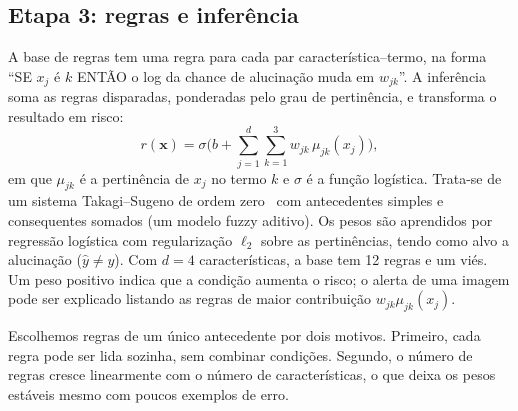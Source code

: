 \documentclass[conference,a4paper]{IEEEtran}
\begin{document}
\subsection{Etapa 3: regras e inferência}
A base de regras tem uma regra para cada par característica--termo, na forma ``SE $x_j$ é $k$ ENTÃO o log da chance de alucinação muda em
$w_{jk}$''. A inferência soma as regras disparadas, ponderadas pelo grau de pertinência, e transforma o resultado em risco:
\begin{equation}
  r(\mathbf{x}) = \sigma\Big(b + \sum_{j=1}^{d}\sum_{k=1}^{3} w_{jk}\,\mu_{jk}(x_j)\Big),
  \label{eq:aditivo}
\end{equation}
em que $\mu_{jk}$ é a pertinência de $x_j$ no termo $k$ e $\sigma$ é a função logística. Trata-se de um sistema Takagi--Sugeno de ordem
zero~\cite{takagi1985} com antecedentes simples e consequentes somados (um modelo fuzzy aditivo). Os pesos são aprendidos por regressão
logística com regularização $\ell_2$ sobre as pertinências, tendo como alvo a alucinação ($\hat y \ne y$). Com $d=4$ características, a
base tem 12 regras e um viés. Um peso positivo indica que a condição aumenta o risco; o alerta de uma imagem pode ser explicado listando as
regras de maior contribuição $w_{jk}\mu_{jk}(x_j)$.

Escolhemos regras de um único antecedente por dois motivos. Primeiro, cada regra pode ser lida sozinha, sem combinar condições. Segundo,
o número de regras cresce linearmente com o número de características, o que deixa os pesos estáveis mesmo com poucos exemplos de erro.
\end{document}
